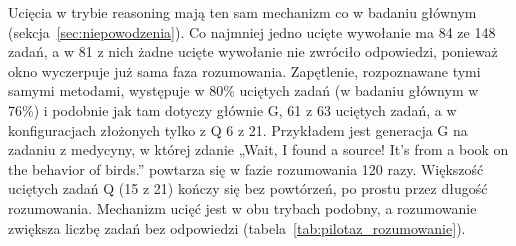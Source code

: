 Ucięcia w trybie reasoning mają ten sam mechanizm co w badaniu głównym (sekcja~\ref{sec:niepowodzenia}). Co najmniej jedno ucięte wywołanie ma 84 ze 148 zadań, a w 81 z nich żadne ucięte wywołanie nie zwróciło odpowiedzi, ponieważ okno wyczerpuje już sama faza rozumowania. Zapętlenie, rozpoznawane tymi samymi metodami, występuje w 80\% uciętych zadań (w badaniu głównym w 76\%) i podobnie jak tam dotyczy głównie G, 61 z 63 uciętych zadań, a w konfiguracjach złożonych tylko z Q 6 z 21. Przykładem jest generacja G na zadaniu z medycyny, w której zdanie „Wait, I found a source! It's from a book on the behavior of birds.” powtarza się w fazie rozumowania 120 razy. Większość uciętych zadań Q (15 z 21) kończy się bez powtórzeń, po prostu przez długość rozumowania. Mechanizm ucięć jest w obu trybach podobny, a rozumowanie zwiększa liczbę zadań bez odpowiedzi (tabela~\ref{tab:pilotaz_rozumowanie}).

